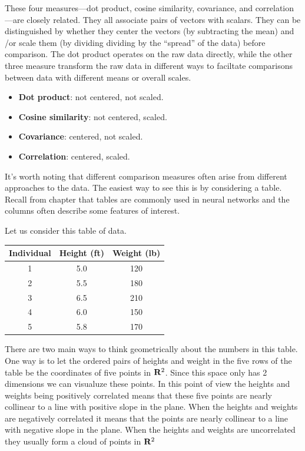    These four measures—dot product, cosine similarity, covariance, and 
correlation—are closely related.  They all associate pairs of vectors with 
scalars.  They can be distinguished by whether they center the vectors (by 
subtracting the mean) and /or scale them (by dividing dividing by the 
``spread'' of the data) before comparison.  The dot product operates on the raw
data directly, while the other three measure transform the raw data in 
different ways to faciltate comparisons between data with different means or 
overall scales.

\begin{itemize}
    \item \textbf{Dot product}: not centered, not scaled.
    \item \textbf{Cosine similarity}: not centered, scaled.
    \item \textbf{Covariance}: centered, not scaled.
    \item \textbf{Correlation}: centered, scaled.
\end{itemize}

   It's worth noting that different comparison measures often arise from 
different  approaches to the data.  The easiest way to see this is by 
considering a table.  Recall from chapter  that tables 
are commonly used in neural networks and the columns often describe some
features of interest.   

   Let us consider this table of data.
\begin{center}
\begin{tabular}{ccc}
\textbf{Individual} & \textbf{Height (ft)} & \textbf{Weight (lb)} \\
\hline
1 & 5.0 & 120 \\
2 & 5.5 & 180 \\
3 & 6.5 & 210 \\
4 & 6.0 & 150 \\
5 & 5.8 & 170 \\
\end{tabular}
\end{center}
There are two main ways to think geometrically about the numbers in this table.
One way is to let the ordered pairs of heights and weight in the five rows of 
the table be the coordinates of five points in ${\bf R}^2$.  Since this space 
only has 2 dimensions we can visualuze these points.  In this point of view 
the heights and weights being positively correlated means that these five 
points are nearly collinear to a line with positive slope in the plane.  When 
the heights and weights are negatively correlated it means that the points are 
nearly collinear to a line with negative slope in the plane.  When the heights 
and weights are uncorrelated they usually form a cloud of points in ${\bf R}^2$ 
\label{twogeoms}

